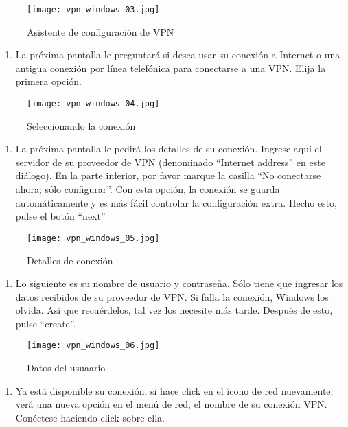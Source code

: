\documentclass[10pt,a5paper,twoside,,]{book}
\providecommand{\tightlist}{%
  \setlength{\itemsep}{0pt}\setlength{\parskip}{0pt}}
\begin{document}
\begin{figure}[htbp]
\centering
\texttt{[image: vpn\_windows\_03.jpg]}
\caption{Asistente de configuración de VPN}
\end{figure}

\begin{enumerate}
\def\labelenumi{\arabic{enumi}.}
\setcounter{enumi}{4}
\tightlist
\item
  La próxima pantalla le preguntará si desea usar su conexión a Internet
  o una antigua conexión por línea telefónica para conectarse a una VPN.
  Elija la primera opción.
\end{enumerate}

\begin{figure}[htbp]
\centering
\texttt{[image: vpn\_windows\_04.jpg]}
\caption{Seleccionando la conexión}
\end{figure}

\begin{enumerate}
\def\labelenumi{\arabic{enumi}.}
\setcounter{enumi}{5}
\tightlist
\item
  La próxima pantalla le pedirá los detalles de su conexión. Ingrese
  aquí el servidor de su proveedor de VPN (denominado ``Internet
  address'' en este diálogo). En la parte inferior, por favor marque la
  casilla ``No conectarse ahora; sólo configurar''. Con esta opción, la
  conexión se guarda automáticamente y es más fácil controlar la
  configuración extra. Hecho esto, pulse el botón ``next''
\end{enumerate}

\begin{figure}[htbp]
\centering
\texttt{[image: vpn\_windows\_05.jpg]}
\caption{Detalles de conexión}
\end{figure}

\begin{enumerate}
\def\labelenumi{\arabic{enumi}.}
\setcounter{enumi}{6}
\tightlist
\item
  Lo siguiente es su nombre de usuario y contraseña. Sólo tiene que
  ingresar los datos recibidos de su proveedor de VPN. Si falla la
  conexión, Windows los olvida. Así que recuérdelos, tal vez los
  necesite más tarde. Después de esto, pulse ``create''.
\end{enumerate}

\begin{figure}[htbp]
\centering
\texttt{[image: vpn\_windows\_06.jpg]}
\caption{Datos del usuaario}
\end{figure}

\begin{enumerate}
\def\labelenumi{\arabic{enumi}.}
\setcounter{enumi}{7}
\tightlist
\item
  Ya está disponible su conexión, si hace click en el ícono de red
  nuevamente, verá una nueva opción en el menú de red, el nombre de su
  conexión VPN. Conéctese haciendo click sobre ella.
\end{enumerate}
\end{document}
